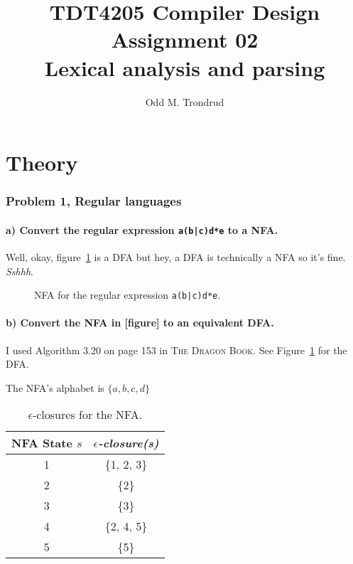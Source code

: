 \documentclass[12pt]{article}
\title{TDT4205 Compiler Design\\
Assignment 02\\
\textbf{Lexical analysis and parsing}}
\author{Odd M. Trondrud}
\begin{document}
\maketitle

\part{Theory}
\section{Problem 1, Regular languages}
\subsection{a) Convert the regular expression \texttt{a(b|c)d*e} to a NFA.}
Well, okay, figure~\ref{fig:1-1-a} is a DFA but hey, a DFA is technically a NFA so it's fine. \textit{Sshhh}.
\begin{figure}[H]
\begin{center}

\caption{NFA for the regular expression \texttt{a(b|c)d*e}.}
\label{fig:1-1-a}
\end{center}
\end{figure}

\subsection{b) Convert the NFA in [figure] to an equivalent DFA.}
I used Algorithm 3.20 on page 153 in \textsc{The Dragon Book}.
See Figure~\ref{fig:1-1-b} for the DFA.

The NFA's alphabet is $\{a, b, c, d\}$

\begin{table}[H]
\begin{center}
	\begin{tabular}{|c|c|}
	\hline
	NFA State $s$ & $\epsilon$\textit{-closure(s)} \\
   	\hline
	1 & \{1, 2, 3\} \\
   	\hline
	2 & \{2\} \\
	\hline
	3 & \{3\} \\
   	\hline
	4 & \{2, 4, 5\} \\
   	\hline
	5 & \{5\} \\
	\hline
	\end{tabular}
	\caption{$\epsilon$-closures for the NFA.}
	\label{fig:1-1-b}
\end{center}
\end{table}
\end{document}

